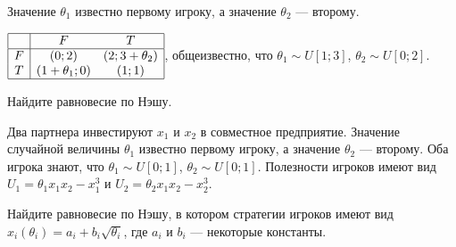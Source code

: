 \begin{problem}

Значение  $\theta _{1} $  известно первому игроку, а значение  $\theta _{2} $  --- второму.

 $\begin{array}{|c|cc|}  \hline {} & {F} & {T} \\  \hline {F} & {\left(0;2\right)} & {\left(2;3+\theta _{2} \right)} \\ {T} & {\left(1+\theta _{1} ;0\right)} & {\left(1;1\right)} \\  \hline  \end{array}$, общеизвестно, что  $\theta _{1} \sim U\left[1;3\right]$,  $\theta _{2} \sim U\left[0;2\right]$.

Найдите равновесие по Нэшу.



\begin{sol}

\end{sol}
\end{problem}



\begin{problem}[Инвестиции.]
Два партнера инвестируют  $x_{1} $  и  $x_{2} $  в совместное предприятие. Значение случайной величины   $\theta _{1} $  известно первому игроку, а значение  $\theta _{2} $  --- второму. Оба игрока знают, что  $\theta _{1} \sim U\left[0;1\right]$,  $\theta _{2} \sim U\left[0;1\right]$.
Полезности игроков имеют вид  $U_{1} =\theta _{1} x_{1} x_{2} -x_{1}^{3} $  и  $U_{2} =\theta _{2} x_{1} x_{2} -x_{2}^{3} $.\par
Найдите равновесие по Нэшу, в котором стратегии игроков имеют вид  $x_{i} \left(\theta _{i} \right)=a_{i} +b_{i} \sqrt{\theta _{i} } $, где  $a_{i} $  и  $b_{i} $  --- некоторые константы. \par




\begin{sol}

\end{sol}
\end{problem}



